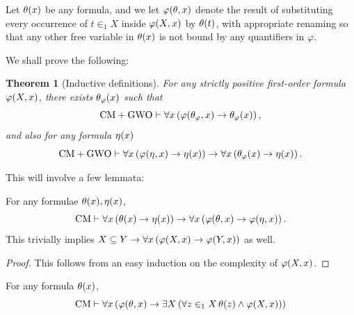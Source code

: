 \documentclass[12pt,openany]{book}
\theoremstyle{plain}
\newtheorem{theorem}{Theorem}[section]
\theoremstyle{definition}
\newcommand\opA[1]{\mathop{\forall #1}}
\newcommand\opE[1]{\mathop{\exists #1}}
\newcommand\CM{\mathrm{CM}}
\newcommand\GWO{\mathrm{GWO}}
\begin{document}
Let $\theta\mleft(x\mright)$ be any formula, and we let $\varphi\mleft(\theta, x\mright)$ denote the result of substituting every occurrence of $t \in_1 X$ inside $\varphi\mleft(X, x\mright)$ by $\theta\mleft(t\mright)$, with appropriate renaming so that any other free variable in $\theta\mleft(x\mright)$ is not bound by any quantifiers in $\varphi$.

We shall prove the following:
\begin{theorem}[Inductive definitions]
  \label{thm:cm-ind-def}
  For any strictly positive first-order formula $\varphi\mleft(X, x\mright)$, there exists $\theta_\varphi\mleft(x\mright)$ such that
  \[\CM + \GWO \vdash \opA{x} \left(\varphi\mleft(\theta_\varphi, x\mright) \rightarrow \theta_\varphi\mleft(x\mright)\right),\]
  and also for any formula $\eta\mleft(x\mright)$
  \[\CM + \GWO \vdash \opA{x} \left(\varphi\mleft(\eta, x\mright) \rightarrow \eta\mleft(x\mright)\right) \rightarrow \opA{x} \left(\theta_\varphi\mleft(x\mright) \rightarrow \eta\mleft(x\mright)\right).\]
\end{theorem}

This will involve a few lemmata:
\begin{lemma}[Positivity]
  \label{lem:cm-ind-pos}
  For any formulae $\theta\mleft(x\mright), \eta\mleft(x\mright)$,
  \[\CM \vdash \opA{x} \left(\theta\mleft(x\mright) \rightarrow \eta\mleft(x\mright)\right) \rightarrow \opA{x} \left(\varphi\mleft(\theta, x\mright) \rightarrow \varphi\mleft(\eta, x\mright)\right).\]
  This trivially implies $X \subseteq Y \rightarrow \opA{x} \left(\varphi\mleft(X, x\mright) \rightarrow \varphi\mleft(Y, x\mright)\right)$ as well.
\end{lemma}

\begin{proof}
  This follows from an easy induction on the complexity of $\varphi\mleft(X, x\mright)$.
\end{proof}

\begin{lemma}
  \label{lem:cm-ind-set-witnesses}
  For any formula $\theta\mleft(x\mright)$,
  \[\CM \vdash \opA{x} \left(\varphi\mleft(\theta, x\mright) \rightarrow \opE{X} \left(\opA{z \in_1 X} \theta\mleft(z\mright) \land \varphi\mleft(X, x\mright)\right)\right)\]
\end{lemma}
\end{document}

